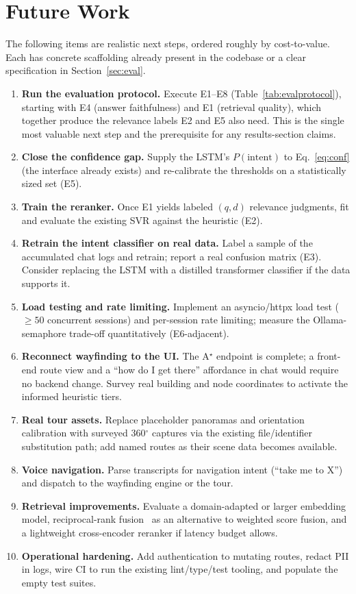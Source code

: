 \section{Future Work}
\label{sec:future}
The following items are realistic next steps, ordered roughly by
cost-to-value. Each has concrete scaffolding already present in the
codebase or a clear specification in Section~\ref{sec:eval}.

\begin{enumerate}
\item \textbf{Run the evaluation protocol.} Execute E1--E8
(Table~\ref{tab:evalprotocol}), starting with E4 (answer faithfulness) and
E1 (retrieval quality), which together produce the relevance labels E2 and
E5 also need. This is the single most valuable next step and the
prerequisite for any results-section claims.
\item \textbf{Close the confidence gap.} Supply the LSTM's
$P(\text{intent})$ to Eq.~\eqref{eq:conf} (the interface already exists) and
re-calibrate the thresholds on a statistically sized set (E5).
\item \textbf{Train the reranker.} Once E1 yields labeled
$(q,d)$ relevance judgments, fit and evaluate the existing SVR against the
heuristic (E2).
\item \textbf{Retrain the intent classifier on real data.} Label a sample
of the accumulated chat logs and retrain; report a real confusion matrix
(E3). Consider replacing the LSTM with a distilled transformer classifier
if the data supports it.
\item \textbf{Load testing and rate limiting.} Implement an
asyncio/httpx load test ($\ge 50$ concurrent sessions) and per-session rate
limiting; measure the Ollama-semaphore trade-off quantitatively (E6-adjacent).
\item \textbf{Reconnect wayfinding to the UI.} The A$^{\star}$ endpoint is
complete; a front-end route view and a ``how do I get there'' affordance in
chat would require no backend change. Survey real building and node
coordinates to activate the informed heuristic tiers.
\item \textbf{Real tour assets.} Replace placeholder panoramas and
orientation calibration with surveyed 360$^{\circ}$ captures via the
existing file/identifier substitution path; add named routes as their scene
data becomes available.
\item \textbf{Voice navigation.} Parse transcripts for navigation intent
(``take me to X'') and dispatch to the wayfinding engine or the tour.
\item \textbf{Retrieval improvements.} Evaluate a domain-adapted or larger
embedding model, reciprocal-rank fusion~\cite{cormack2009rrf} as an
alternative to weighted score fusion, and a lightweight cross-encoder
reranker if latency budget allows.
\item \textbf{Operational hardening.} Add authentication to mutating
routes, redact PII in logs, wire CI to run the existing lint/type/test
tooling, and populate the empty test suites.
\end{enumerate}
